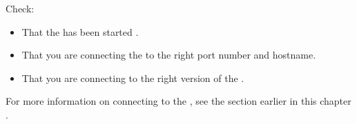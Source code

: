 


Check:
\begin{itemize}
\item That the \gdserver has been started .
\item That you are connecting the \gdserver to the right port number and \gdserver hostname. 
\item That you are connecting to the right version of the \gdserver. 
 
\end{itemize}

For more information on connecting to the \gdserver, see the section earlier in this chapter .


